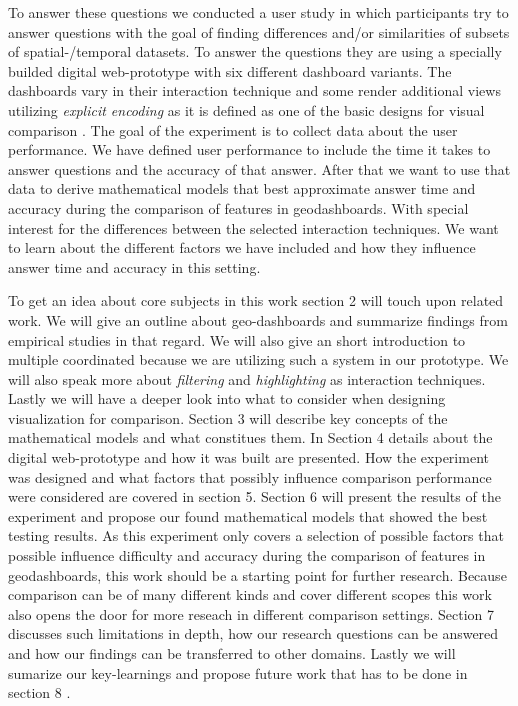 \documentclass[12pt, twoside]{article}
\begin{document}
To answer these questions we conducted a user study in which participants try to answer
questions with the goal of finding differences and/or similarities of subsets
of spatial-/temporal datasets. To answer the
questions they are using a specially builded digital web-prototype with six different dashboard
variants. The dashboards vary in their interaction technique and some render additional views
utilizing \textit{explicit encoding} as it is defined as one of the basic designs for visual
comparison \citep*{Gleicher.2018}. The goal of the experiment is to collect data about the user
performance. We have defined user performance to include the time it takes to answer questions
and the accuracy of that answer. After that we want to use that data to derive mathematical
models that best approximate answer time and accuracy during the comparison of features in
geodashboards. With special interest for the differences between the selected interaction
techniques. We want to learn about the different factors we have included and how they
influence answer time and accuracy in this setting.

To get an idea about core subjects in this work section 2 will touch upon related work. We
will give an outline about geo-dashboards and summarize findings from empirical studies in that
regard. We will also give an short introduction to multiple coordinated because we are utilizing
such a system in our prototype. We will also speak more about \textit{filtering} and
\textit{highlighting} as interaction techniques. Lastly we will have a deeper look into what to
consider when designing visualization for comparison.
Section 3 will describe key concepts of the mathematical models and what constitues them.
In Section 4 details about the digital web-prototype and how it was built are presented. How the
experiment was designed and what factors that possibly influence comparison performance were considered
are covered in section 5. Section 6 will present the results of the experiment and propose our found
mathematical models that showed the best testing results.
As this experiment only covers a selection of possible factors that possible influence difficulty and
accuracy during the comparison of features in geodashboards, this work should be a starting point for
further research. Because comparison can be of many different kinds and cover different scopes this work
also opens the door for more reseach in different comparison settings. Section 7 discusses such limitations
in depth, how our research questions can be answered and how our findings can be transferred to other domains.
Lastly we will sumarize our key-learnings and propose future work that has to be done in section 8  .
\end{document}
